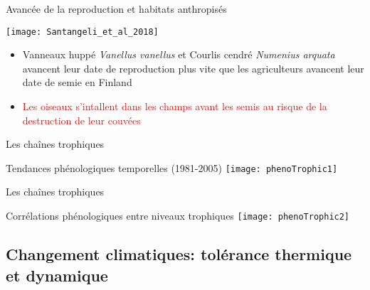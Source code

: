\documentclass[10pt]{beamer}
\begin{document}
\begin{frame}{Avancée de la reproduction et habitats anthropisés}
    
  \begin{center}  
    \vspace{10pt}
    \texttt{[image: Santangeli\_et\_al\_2018]}
  \end{center}
  \begin{itemize}[<+->]
   \item  Vanneaux huppé \textit{Vanellus vanellus} et Courlis cendré \textit{Numenius arquata} avancent leur date de reproduction plus vite que les agriculteurs avancent leur date de semie en Finland
\item \textcolor{red}{Les oiseaux s'intallent dans les champs avant les semis au risque de la destruction de leur couvées}
  \end{itemize}

  \begin{tiny}
    \cite{Santangeli2018}

  \end{tiny}
\end{frame}





\begin{frame}{Les chaînes trophiques}
  \begin{center}
    Tendances phénologiques temporelles (1981-2005)
    \vspace{5pt}
    \texttt{[image: phenoTrophic1]}
  \end{center}
  \begin{tiny}
    \cite{Both2009}
  \end{tiny}
\end{frame}

\begin{frame}{Les chaînes trophiques}
  \begin{center}
    Corrélations phénologiques entre niveaux trophiques
    \vspace{5pt}
    \texttt{[image: phenoTrophic2]}
  \end{center}
  \begin{tiny}
    \cite{Both2009}
  \end{tiny}
\end{frame}



\subsection{Changement climatiques: tolérance thermique et dynamique}
\end{document}
